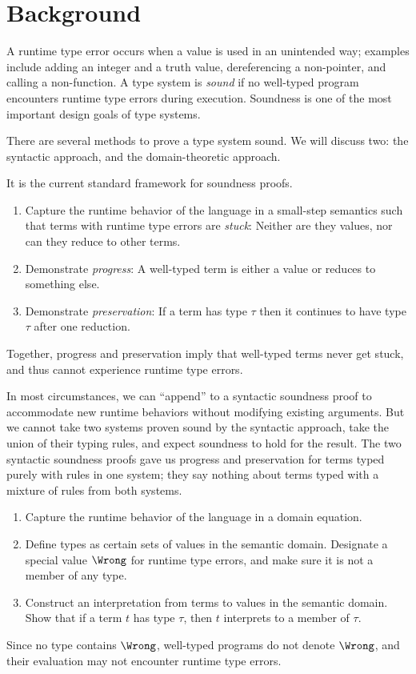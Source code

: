 \documentclass{amsart}
\begin{document}
\section{Background}

A runtime type error occurs when a value is used in an unintended
way; examples include adding an integer and a truth value,
dereferencing a non-pointer, and calling a non-function. A type
system is \emph{sound} if no well-typed program encounters
runtime type errors during execution. Soundness is one of the
most important design goals of type systems.

There are several methods to prove a type system sound. We will
discuss two: the syntactic approach, and the domain-theoretic
approach.


It is the current standard framework for soundness proofs.
\begin{enumerate}
\item Capture the runtime behavior of the language in a
small-step semantics such that terms with runtime type errors are
\emph{stuck}: Neither are they values, nor can they reduce to
other terms.
\item Demonstrate \emph{progress}: A well-typed term is either a
value or reduces to something else.
\item Demonstrate \emph{preservation}: If a term has type $\tau$
then it continues to have type $\tau$ after one reduction.
\end{enumerate}
Together, progress and preservation imply that well-typed terms
never get stuck, and thus cannot experience runtime type errors.

In most circumstances, we can ``append'' to a syntactic soundness
proof to accommodate new runtime behaviors without modifying
existing arguments. But we cannot take two systems proven sound
by the syntactic approach, take the union of their typing rules,
and expect soundness to hold for the result. The two syntactic
soundness proofs gave us progress and preservation for terms
typed purely with rules in one system; they say nothing about
terms typed with a mixture of rules from both systems.


\begin{enumerate}
\item Capture the runtime behavior of the language in a domain
equation.
\item Define types as certain sets of values in the semantic
domain. Designate a special value $\Wrong$ for runtime type
errors, and make sure it is not a member of any type.
\item Construct an interpretation from terms to values in the
semantic domain. Show that if a term $t$ has type $\tau$, then
$t$ interprets to a member of $\tau$.
\end{enumerate}
Since no type contains $\Wrong$, well-typed programs do not
denote $\Wrong$, and their evaluation may not encounter runtime
type errors.
\end{document}
